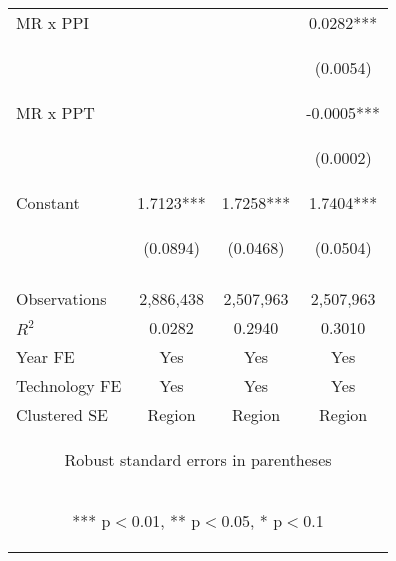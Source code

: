 \begin{center}
\begin{tabular}{lccc}
MR x PPI &  &  & 0.0282*** \\
\vspace{4pt} & \begin{footnotesize}\end{footnotesize} & \begin{footnotesize}\end{footnotesize} & \begin{footnotesize}(0.0054)\end{footnotesize} \\
MR x PPT &  &  & -0.0005*** \\
\vspace{4pt} & \begin{footnotesize}\end{footnotesize} & \begin{footnotesize}\end{footnotesize} & \begin{footnotesize}(0.0002)\end{footnotesize} \\
Constant & 1.7123*** & 1.7258*** & 1.7404*** \\
 & \begin{footnotesize}(0.0894)\end{footnotesize} & \begin{footnotesize}(0.0468)\end{footnotesize} & \begin{footnotesize}(0.0504)\end{footnotesize} \\
\vspace{4pt} & \begin{footnotesize}\end{footnotesize} & \begin{footnotesize}\end{footnotesize} & \begin{footnotesize}\end{footnotesize} \\
Observations & 2,886,438 & 2,507,963 & 2,507,963 \\
$R^2$ & 0.0282 & 0.2940 & 0.3010 \\
Year FE & Yes & Yes & Yes \\
Technology FE & Yes & Yes & Yes \\
 Clustered SE & Region & Region & Region \\ \hline
\multicolumn{4}{c}{\begin{footnotesize} Robust standard errors in parentheses\end{footnotesize}} \\
\multicolumn{4}{c}{\begin{footnotesize} *** p$<$0.01, ** p$<$0.05, * p$<$0.1\end{footnotesize}} \\
\end{tabular}
\end{center}
